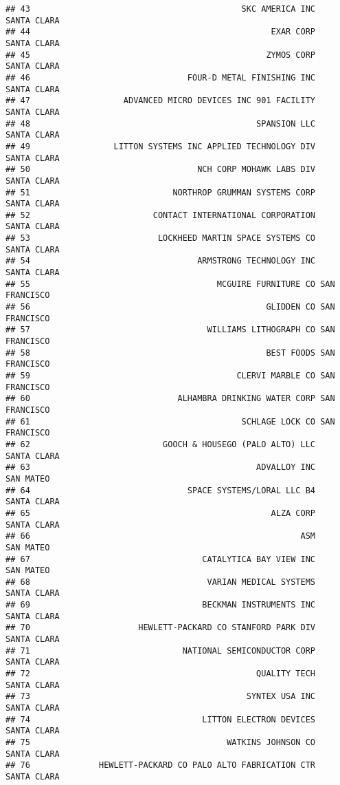 \documentclass[
]{book}
\begin{document}
\begin{verbatim}
## 43                                           SKC AMERICA INC   SANTA CLARA
## 44                                                 EXAR CORP   SANTA CLARA
## 45                                                ZYMOS CORP   SANTA CLARA
## 46                                FOUR-D METAL FINISHING INC   SANTA CLARA
## 47                   ADVANCED MICRO DEVICES INC 901 FACILITY   SANTA CLARA
## 48                                              SPANSION LLC   SANTA CLARA
## 49                 LITTON SYSTEMS INC APPLIED TECHNOLOGY DIV   SANTA CLARA
## 50                                  NCH CORP MOHAWK LABS DIV   SANTA CLARA
## 51                             NORTHROP GRUMMAN SYSTEMS CORP   SANTA CLARA
## 52                         CONTACT INTERNATIONAL CORPORATION   SANTA CLARA
## 53                          LOCKHEED MARTIN SPACE SYSTEMS CO   SANTA CLARA
## 54                                  ARMSTRONG TECHNOLOGY INC   SANTA CLARA
## 55                                      MCGUIRE FURNITURE CO SAN FRANCISCO
## 56                                                GLIDDEN CO SAN FRANCISCO
## 57                                    WILLIAMS LITHOGRAPH CO SAN FRANCISCO
## 58                                                BEST FOODS SAN FRANCISCO
## 59                                          CLERVI MARBLE CO SAN FRANCISCO
## 60                              ALHAMBRA DRINKING WATER CORP SAN FRANCISCO
## 61                                           SCHLAGE LOCK CO SAN FRANCISCO
## 62                           GOOCH & HOUSEGO (PALO ALTO) LLC   SANTA CLARA
## 63                                              ADVALLOY INC     SAN MATEO
## 64                                SPACE SYSTEMS/LORAL LLC B4   SANTA CLARA
## 65                                                 ALZA CORP   SANTA CLARA
## 66                                                       ASM     SAN MATEO
## 67                                   CATALYTICA BAY VIEW INC     SAN MATEO
## 68                                    VARIAN MEDICAL SYSTEMS   SANTA CLARA
## 69                                   BECKMAN INSTRUMENTS INC   SANTA CLARA
## 70                      HEWLETT-PACKARD CO STANFORD PARK DIV   SANTA CLARA
## 71                               NATIONAL SEMICONDUCTOR CORP   SANTA CLARA
## 72                                              QUALITY TECH   SANTA CLARA
## 73                                            SYNTEX USA INC   SANTA CLARA
## 74                                   LITTON ELECTRON DEVICES   SANTA CLARA
## 75                                        WATKINS JOHNSON CO   SANTA CLARA
## 76              HEWLETT-PACKARD CO PALO ALTO FABRICATION CTR   SANTA CLARA

\end{verbatim}
\end{document}
